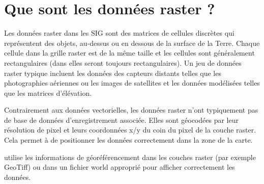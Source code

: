 \section{Que sont les données raster ?}\label{label_whatsraster}

Les données raster dans les SIG sont des matrices de cellules discrètes qui
représentent des objets, au-dessus ou en dessous de la surface de la Terre.
Chaque cellule dans la grille raster est de la même taille et les cellules sont
généralement rectangulaires (dans \qg elles seront toujours rectangulaires).
Un jeu de données raster typique incluent les données des capteurs distants
telles que les photographies aériennes ou les images de satellites et les
données modélisées telles que les matrices d'élévation.

Contrairement aux données vectorielles, les données raster n'ont typiquement pas de
base de données d'enregistrement associée. Elles sont géocodées par leur
résolution de pixel et leurs coordonnées x/y du coin du pixel de la couche
raster. Cela permet à \qg de positionner les données correctement dans la zone
de la carte.

\qg utilise les informations de géoréférencement dans les couches raster (par
exemple GeoTiff) ou dans un fichier world approprié pour afficher correctement
les données.

